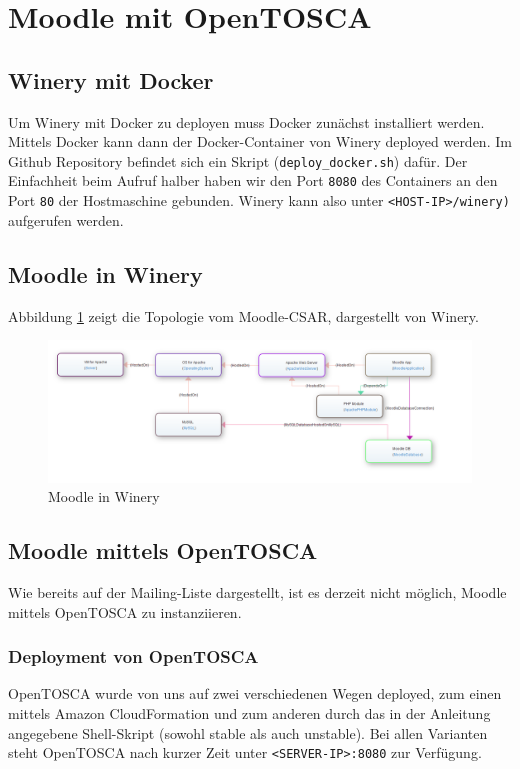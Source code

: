 \section{Moodle mit OpenTOSCA}
\subsection{Winery mit Docker}

Um Winery mit Docker zu deployen muss Docker zunächst installiert werden. Mittels Docker kann dann der Docker-Container von Winery deployed werden. Im Github Repository befindet sich ein Skript (\verb|deploy_docker.sh|) dafür. Der Einfachheit beim Aufruf halber haben wir den Port \verb|8080| des Containers an den Port \verb|80| der Hostmaschine gebunden. Winery kann also unter \verb|<HOST-IP>/winery)| aufgerufen werden.


\subsection{Moodle in Winery}
Abbildung \ref{fig:moodle_winery} zeigt die Topologie vom Moodle-CSAR, dargestellt von Winery.

\begin{figure}
\centering
\includegraphics[width=\textwidth]{3/winery_moodle}
\caption{Moodle in Winery}
\label{fig:moodle_winery}
\end{figure}
\subsection{Moodle mittels OpenTOSCA}
Wie bereits auf der Mailing-Liste dargestellt, ist es derzeit nicht möglich, Moodle mittels OpenTOSCA zu instanziieren.
\subsubsection{Deployment von OpenTOSCA}
OpenTOSCA wurde von uns auf zwei verschiedenen Wegen deployed, zum einen mittels Amazon CloudFormation und zum anderen durch das in der Anleitung angegebene Shell-Skript (sowohl stable als auch unstable). Bei allen Varianten steht OpenTOSCA nach kurzer Zeit unter \verb|<SERVER-IP>:8080| zur Verfügung.
